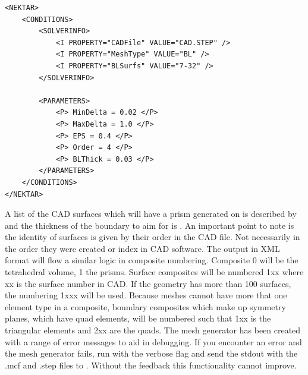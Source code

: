\begin{lstlisting}[style=XmlStyle]
<NEKTAR>
    <CONDITIONS>
        <SOLVERINFO>
            <I PROPERTY="CADFile" VALUE="CAD.STEP" />
            <I PROPERTY="MeshType" VALUE="BL" />
	        <I PROPERTY="BLSurfs" VALUE="7-32" />
        </SOLVERINFO>

        <PARAMETERS>
            <P> MinDelta = 0.02 </P>
            <P> MaxDelta = 1.0 </P>
            <P> EPS = 0.4 </P>
            <P> Order = 4 </P>
            <P> BLThick = 0.03 </P>
        </PARAMETERS>
    </CONDITIONS>
</NEKTAR>
\end{lstlisting}
A list of the CAD surfaces which will have a prism generated on is described by
 and the thickness of the boundary to aim for is .
%
An important point to note is the identity of surfaces is given by their order
in the CAD file. Not necessarily in the order they were created or index in
CAD software. The output in XML format will flow a similar logic in composite
numbering. Composite 0 will be the tetrahedral volume, 1 the prisms. Surface
composites will be numbered 1xx where xx is the surface number in CAD. If
the geometry has more than 100 surfaces, the numbering 1xxx will be used.
Because \nekpp meshes cannot have more that one element type in a composite,
boundary composites which make up symmetry planes, which have quad elements,
will be numbered such that 1xx is the triangular elements and 2xx are the quads.
%
The mesh generator has been created with a range of error messages to aid in
debugging. If you encounter an error and the mesh generator fails, run \mc with
the verbose  flag and send the stdout with the .mcf and .step files
to . Without the feedback this functionality
cannot improve.


